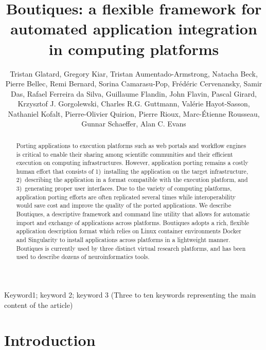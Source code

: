 \documentclass[a4paper,num-refs]{oup-contemporary}
\title{Boutiques: a flexible framework for automated application integration in computing platforms}
\newcommand{\boutiques}{Boutiques\xspace}
\begin{document}
\author{Tristan Glatard, Gregory Kiar, Tristan Aumentado-Armstrong,
  Natacha Beck, Pierre Bellec, Remi Bernard, Sorina Camarasu-Pop,
  Fr\'ed\'eric Cervenansky, Samir Das,  Rafael Ferreira da Silva,
  Guillaume Flandin, John Flavin, Pascal Girard, Krzysztof
  J. Gorgolewski, Charles R.G. Guttmann, Val\'erie Hayot-Sasson,
  Nathaniel Kofalt, Pierre-Olivier Quirion, Pierre Rioux,
  Marc-\'Etienne Rousseau, Gunnar Schaeffer, Alan C. Evans}


\begin{frontmatter}
\maketitle

\begin{abstract}Porting applications to execution platforms such as web
  portals and workflow engines is critical to enable their sharing
  among scientific communities and their efficient execution on
  computing infrastructures. However, application porting remains a
  costly human effort that consists of 1)~installing the application
  on the target infrastructure, 2)~describing the application in a
  format compatible with the execution platform, and 3)~generating
  proper user interfaces. Due to the variety of computing platforms,
  application porting efforts are often replicated several times while
  interoperability would save cost and improve the quality of the ported
  applications. We describe \boutiques, a descriptive framework and
  command line utility that allows for automatic import and exchange of
  applications across platforms. \boutiques adopts a rich, flexible
  application description format which relies on Linux container
  environments Docker and Singularity to install applications
  across platforms in a lightweight manner. \boutiques is currently used
  by three distinct virtual research platforms, and has been used to
  describe dozens of neuroinformatics tools.
\end{abstract}

\begin{keywords}
Keyword1; keyword 2; keyword 3 (Three to ten keywords representing the main content of the article)
\end{keywords}
\end{frontmatter}

\section{Introduction}
\end{document}
